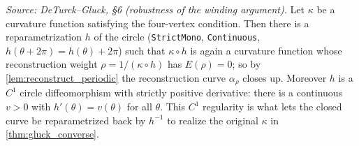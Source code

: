 \begin{lemma}


  \label{lem:reduction_justified}
  \textit{Source: DeTurck--Gluck, §6 (robustness of the winding argument).}
  Let $\kappa$ be a curvature function satisfying the four-vertex condition. Then
  there is a reparametrization $h$ of the circle (\texttt{StrictMono},
  \texttt{Continuous}, $h(\theta+2\pi)=h(\theta)+2\pi$) such that $\kappa\circ h$ is
  again a curvature function whose reconstruction weight $\rho = 1/(\kappa\circ h)$
  has $E(\rho)=0$; so by \cref{lem:reconstruct_periodic} the reconstruction curve
  $\alpha_\rho$ closes up. Moreover $h$ is a $C^1$ circle diffeomorphism with
  strictly positive derivative: there is a continuous $v>0$ with
  $h'(\theta)=v(\theta)$ for all $\theta$. This $C^1$ regularity is what lets the
  closed curve be reparametrized back by $h^{-1}$ to realize the original $\kappa$
  in \cref{thm:gluck_converse}.
\end{lemma}
